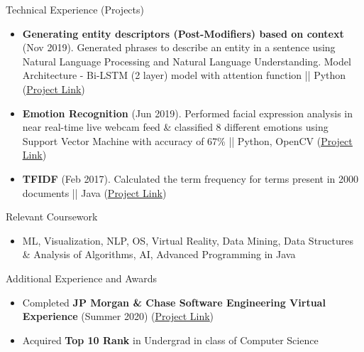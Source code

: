 \documentclass[]{mcdowellcv}
\begin{document}
\begin{cvsection}{Technical Experience (Projects)}
\begin{cvsubsection}{}{}{}
			\begin{itemize}
				\item \textbf{Generating entity descriptors (Post-Modifiers) based on context} (Nov 2019). Generated phrases to describe an entity in a sentence using Natural Language Processing and Natural Language Understanding. Model Architecture - Bi-LSTM (2 layer) model with attention function || Python (\href{https://github.com/shanujshekhar/Improvement-on-Knowledge-backed-Generation-Model-Using-Post-Modifier-Dataset}{\underline{Project Link}})
			\end{itemize}
		\end{cvsubsection}
	    \begin{cvsubsection}{}{}{}
			\begin{itemize}
				\item \textbf{Emotion Recognition} (Jun 2019). Performed facial expression analysis in near real-time live webcam feed \& classified 8 different emotions using Support Vector Machine with accuracy of 67\% || Python, OpenCV (\href{https://github.com/shanujshekhar/Emotion_Recognition}{\underline{Project Link}})
			\end{itemize}
		\end{cvsubsection}
	    \begin{cvsubsection}{}{}{}
			\begin{itemize}
				\item \textbf{TFIDF} (Feb 2017). Calculated the term frequency for terms present in 2000 documents || Java (\href{https://github.com/shanujshekhar/TFIDF}{\underline{Project Link}})
			\end{itemize}
		\end{cvsubsection}
	\end{cvsection}
	
	\begin{cvsection}{Relevant Coursework}
		\begin{cvsubsection}{}{}{}	
			\begin{itemize}
				\item ML, Visualization, NLP, OS, Virtual Reality, Data Mining, Data Structures \& Analysis of Algorithms, AI, Advanced Programming in Java
			\end{itemize}
		\end{cvsubsection}
	\end{cvsection}
	
	\begin{cvsection}{Additional Experience and Awards}
		\begin{cvsubsection}{}{}{}	
			\begin{itemize}
			    \item Completed \textbf{JP Morgan \& Chase Software Engineering Virtual Experience} (Summer 2020) (\href{https://github.com/shanujshekhar/JPMorgan_Chase_Co_Virtual_Experience}{\underline{Project Link}})
				\item Acquired \textbf{Top 10 Rank} in Undergrad in class of Computer Science
			\end{itemize}
		\end{cvsubsection}
	\end{cvsection}
	
\end{document}
